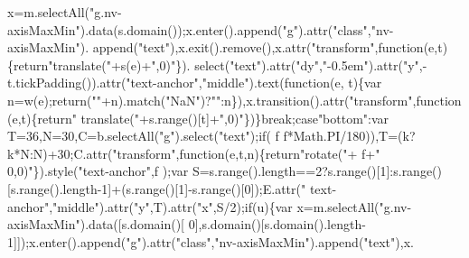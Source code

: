 \begin{DoxyCode}
      x=m.selectAll(\textcolor{stringliteral}{"g.nv-axisMaxMin"}).data(s.domain());x.enter().append(\textcolor{stringliteral}{"g"}).attr(\textcolor{stringliteral}{"class"},\textcolor{stringliteral}{"nv-axisMaxMin"}).
      append(\textcolor{stringliteral}{"text"}),x.exit().remove(),x.attr(\textcolor{stringliteral}{"transform"},\textcolor{keyword}{function}(e,t)\{\textcolor{keywordflow}{return}\textcolor{stringliteral}{"translate("}+s(e)+\textcolor{stringliteral}{",0)"}\}).
      select(\textcolor{stringliteral}{"text"}).attr(\textcolor{stringliteral}{"dy"},\textcolor{stringliteral}{"-0.5em"}).attr(\textcolor{stringliteral}{"y"},-t.tickPadding()).attr(\textcolor{stringliteral}{"text-anchor"},\textcolor{stringliteral}{"middle"}).text(\textcolor{keyword}{function}(e,
      t)\{var n=w(e);\textcolor{keywordflow}{return}(\textcolor{stringliteral}{""}+n).match(\textcolor{stringliteral}{"NaN"})?\textcolor{stringliteral}{""}:n\}),x.transition().attr(\textcolor{stringliteral}{"transform"},\textcolor{keyword}{function}(e,t)\{\textcolor{keywordflow}{return}\textcolor{stringliteral}{"
      translate("}+s.range()[t]+\textcolor{stringliteral}{",0)"}\})\}\textcolor{keywordflow}{break};\textcolor{keywordflow}{case}\textcolor{stringliteral}{"bottom"}:var T=36,N=30,C=b.selectAll(\textcolor{stringliteral}{"g"}).select(\textcolor{stringliteral}{"text"});\textcolor{keywordflow}{if}(
      f%
      f*Math.PI/180)),T=(k?k*N:N)+30;C.attr(\textcolor{stringliteral}{"transform"},\textcolor{keyword}{function}(e,t,n)\{\textcolor{keywordflow}{return}\textcolor{stringliteral}{"rotate("}+
      f+\textcolor{stringliteral}{" 0,0)"}\}).style(\textcolor{stringliteral}{"text-anchor"},f%
      );var S=s.range().length==2?s.range()[1]:s.range()[s.range().length-1]+(s.range()[1]-s.range()[0]);E.attr(\textcolor{stringliteral}{"
      text-anchor"},\textcolor{stringliteral}{"middle"}).attr(\textcolor{stringliteral}{"y"},T).attr(\textcolor{stringliteral}{"x"},S/2);\textcolor{keywordflow}{if}(u)\{var x=m.selectAll(\textcolor{stringliteral}{"g.nv-axisMaxMin"}).data([s.domain()[
      0],s.domain()[s.domain().length-1]]);x.enter().append(\textcolor{stringliteral}{"g"}).attr(\textcolor{stringliteral}{"class"},\textcolor{stringliteral}{"nv-axisMaxMin"}).append(\textcolor{stringliteral}{"text"}),x.

\end{DoxyCode}
